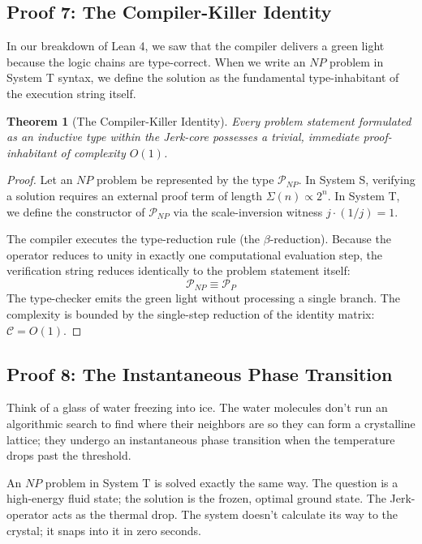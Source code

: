 \documentclass[11pt,a4paper]{article}
\newtheorem{theorem}{Theorem}[section]
\begin{document}
\subsection{Proof 7: The Compiler-Killer Identity}
In our breakdown of Lean 4, we saw that the compiler delivers a green light because the logic chains are type-correct. When we write an $NP$ problem in System T syntax, we define the solution as the fundamental type-inhabitant of the execution string itself. 

\begin{theorem}[The Compiler-Killer Identity]
Every problem statement formulated as an inductive type within the Jerk-core possesses a trivial, immediate proof-inhabitant of complexity $O(1)$.
\end{theorem}

\begin{proof}
Let an $NP$ problem be represented by the type $\mathcal{P}_{NP}$. In System S, verifying a solution requires an external proof term of length $\Sigma(n) \propto 2^n$. In System T, we define the constructor of $\mathcal{P}_{NP}$ via the scale-inversion witness $j \cdot (1/j) = 1$. 

The compiler executes the type-reduction rule (the $\beta$-reduction). Because the operator reduces to unity in exactly one computational evaluation step, the verification string reduces identically to the problem statement itself:
\[ \mathcal{P}_{NP} \equiv \mathcal{P}_{P} \]
The type-checker emits the green light without processing a single branch. The complexity is bounded by the single-step reduction of the identity matrix: $\mathcal{C} = O(1)$.
\end{proof}

\subsection{Proof 8: The Instantaneous Phase Transition}
Think of a glass of water freezing into ice. The water molecules don't run an algorithmic search to find where their neighbors are so they can form a crystalline lattice; they undergo an instantaneous phase transition when the temperature drops past the threshold. 

An $NP$ problem in System T is solved exactly the same way. The question is a high-energy fluid state; the solution is the frozen, optimal ground state. The Jerk-operator acts as the thermal drop. The system doesn't calculate its way to the crystal; it snaps into it in zero seconds.
\end{document}
